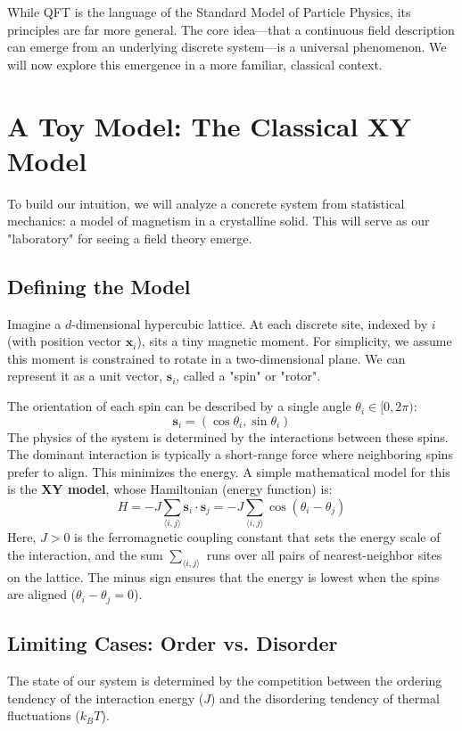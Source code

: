 \documentclass[11pt, a4paper, article]{article}
\renewcommand{\vec}[1]{\bm{#1}} %
\begin{document}
While QFT is the language of the Standard Model of Particle Physics, its principles are far more general. The core idea—that a continuous field description can emerge from an underlying discrete system—is a universal phenomenon. We will now explore this emergence in a more familiar, classical context.

\newpage
\section{A Toy Model: The Classical XY Model}
To build our intuition, we will analyze a concrete system from statistical mechanics: a model of magnetism in a crystalline solid. This will serve as our "laboratory" for seeing a field theory emerge.

\subsection{Defining the Model}
Imagine a $d$-dimensional hypercubic lattice. At each discrete site, indexed by $i$ (with position vector $\vec{x}_i$), sits a tiny magnetic moment. For simplicity, we assume this moment is constrained to rotate in a two-dimensional plane. We can represent it as a unit vector, $\vec{s}_i$, called a "spin" or "rotor".

The orientation of each spin can be described by a single angle $\theta_i \in [0, 2\pi)$:
\begin{equation}
    \vec{s}_i = (\cos\theta_i, \sin\theta_i)
\end{equation}
The physics of the system is determined by the interactions between these spins. The dominant interaction is typically a short-range force where neighboring spins prefer to align. This minimizes the energy. A simple mathematical model for this is the \textbf{XY model}, whose Hamiltonian (energy function) is:
\begin{equation}
    H = -J \sum_{\langle i,j \rangle} \vec{s}_i \cdot \vec{s}_j = -J \sum_{\langle i,j \rangle} \cos(\theta_i - \theta_j)
    \label{eq:hamiltonian}
\end{equation}
Here, $J > 0$ is the ferromagnetic coupling constant that sets the energy scale of the interaction, and the sum $\sum_{\langle i,j \rangle}$ runs over all pairs of nearest-neighbor sites on the lattice. The minus sign ensures that the energy is lowest when the spins are aligned ($\theta_i - \theta_j = 0$).



\subsection{Limiting Cases: Order vs. Disorder}
The state of our system is determined by the competition between the ordering tendency of the interaction energy ($J$) and the disordering tendency of thermal fluctuations ($k_B T$).
\end{document}
